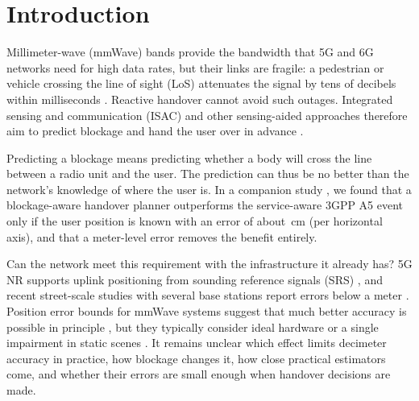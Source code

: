 \documentclass[conference]{IEEEtran}
\begin{document}
\section{Introduction}
Millimeter-wave (mmWave) bands provide the bandwidth that 5G and 6G
networks need for high data rates, but their links are fragile: a
pedestrian or vehicle crossing the line of sight (LoS) attenuates the
signal by tens of decibels within milliseconds
\cite{rappaport2013mmwave,maccartney2017blockage}. Reactive handover
cannot avoid such outages. Integrated sensing and communication (ISAC) and
other sensing-aided approaches therefore aim to predict blockage and
hand the user over in advance
\cite{liu2022isac,charan2021vision,li2025lookbefore}.

Predicting a blockage means predicting whether a body will cross the
line between a radio unit and the user. The prediction can thus be no
better than the network's knowledge of where the user is. In a companion
study \cite{natanzi2027companion}, we found that a blockage-aware
handover planner outperforms the service-aware 3GPP A5 event only if
the user position is known with an error of about \pBreakEven\,cm (per
horizontal axis), and that a meter-level error removes the benefit
entirely.

Can the network meet this requirement with the infrastructure it
already has? 5G NR supports uplink positioning from sounding reference
signals (SRS) \cite{3gpp38855}, and recent street-scale studies with
several base stations report errors below a meter
\cite{dong2026deployable}. Position error bounds for mmWave systems
suggest that much better accuracy is possible in principle
\cite{shahmansoori2018position,abushaban2018bounds}, but they typically
consider ideal hardware or a single impairment in static scenes
\cite{keskin2022optimal}. It remains unclear which effect
limits decimeter accuracy in practice, how blockage changes it, how
close practical estimators come, and whether their errors are small
enough when handover decisions are made.
\end{document}

